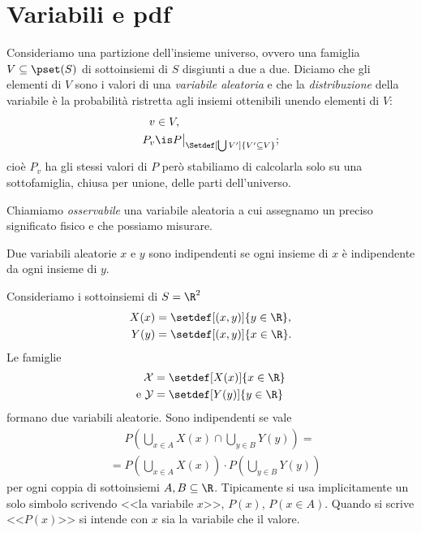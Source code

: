 \section{Variabili e pdf}

\begin{definition}
	Consideriamo una partizione dell'insieme universo,
	ovvero una famiglia $V\subseteq\pset(S)$ di sottoinsiemi di $S$ disgiunti a due a due.
	Diciamo che gli elementi di $V$ sono i valori di una \emph{variabile aleatoria}
	e che la \emph{distribuzione} della variabile è la probabilità
	ristretta agli insiemi ottenibili unendo elementi di $V$:
	\begin{align*}
		v &\in V, \\
		P_v &\is P\big|_{\Setdef[\bigcup V']{V'\subseteq V}};
	\end{align*}
	cioè $P_v$ ha gli stessi valori di $P$
	però stabiliamo di calcolarla solo su una sottofamiglia, chiusa per unione, delle parti dell'universo.
\end{definition}

\begin{definition}[Osservabile]
	Chiamiamo \emph{osservabile} una variabile aleatoria a cui assegnamo un preciso significato fisico e che possiamo misurare.
\end{definition}

\begin{definition}
	Due variabili aleatorie $x$ e $y$ sono indipendenti se ogni insieme di $x$ è indipendente da ogni insieme di $y$.
\end{definition}

\begin{example}
	Consideriamo i sottoinsiemi di $S=\R^2$
	\begin{align*}
		X(x) &= \setdef[(x,y)]{y\in\R}, \\
		Y(y) &= \setdef[(x,y)]{x\in\R}.
	\end{align*}
	Le famiglie
	\begin{align*}
		\mathcal X &= \setdef[X(x)]{x\in\R} \\
		\text{e }\mathcal Y &= \setdef[Y(y)]{y\in\R}
	\end{align*}
	formano due variabili aleatorie.
	Sono indipendenti se vale
	\begin{align*}
		&\phantom{{}={}} P\left( \bigcup_{x\in A} X(x) \cap \bigcup_{y\in B} Y(y) \right) = \\
		&= P\left( \bigcup_{x\in A} X(x) \right) \cdot P\left( \bigcup_{y\in B} Y(y) \right)
	\end{align*}
	per ogni coppia di sottoinsiemi $A,B\subseteq\R$.
	Tipicamente si usa implicitamente un solo simbolo scrivendo
	<<la variabile $x$>>, $P(x)$, $P(x\in A)$.
	Quando si scrive <<$P(x)$>> si intende con $x$ sia la variabile che il valore.
\end{example}

